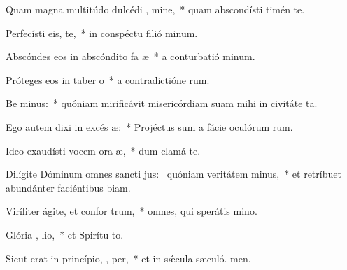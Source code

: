 \item Quam magna multitúdo dulcédi , mine,~* quam abscondísti timén te.
\item Perfecísti eis,    te,~* in conspéctu filió minum.
\item Abscóndes eos in abscóndito fa æ~* a conturbatió minum.
\item Próteges eos in taber o~* a contradictióne rum.
\item Be minus:~* quóniam mirificávit misericórdiam suam mihi in civitáte ta.
\item Ego autem dixi in excés  æ:~* Projéctus sum a fácie oculórum rum.
\item Ideo exaudísti vocem ora æ,~* dum clamá  te.
\item Dilígite Dóminum omnes sancti jus:~\pscross{} quóniam veritátem  minus,~* et retríbuet abundánter faciéntibus biam.
\item Viríliter ágite, et confor  trum,~* omnes, qui sperátis  mino.
\item Glória ,  lio,~* et Spirítu to.
\item Sicut erat in princípio,  ,  per,~* et in sǽcula sæculó. men.
